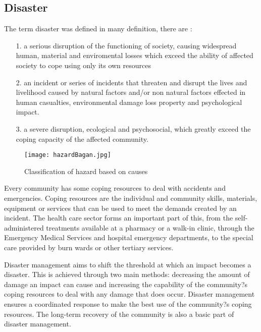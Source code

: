 \subsection{Disaster}
The term disaster was defined in many definition, there are :
\begin{enumerate}
\item[1.] a serious disruption of the functioning of society, causing widespread human, material and enviromental losses which exceed the ability of affected society to cope using only its own resources\cite{EffisientDM}
\item[2.] an incident or series of incidents that threaten and disrupt the lives and livelihood caused by natural factors and/or non natural factors effected in human casualties, environmental damage loss property and psychological impact\cite{DefinisiBencanaBNPB}.
\item[3.] a severe disruption, ecological and psychosocial, which greatly exceed the coping capacity of the affected community\cite{DisasterDefinition}.
\end{enumerate} \par
\begin{figure}[H]
    \begin{center}
    \texttt{[image: hazardBagan.jpg]}
        \caption{Classification of hazard based on causes\cite{definisiHazard}}
        \label{fig:DefinisiHazard}
    \end{center}
\end{figure}
Every community has some coping resources to deal with accidents and emergencies. Coping resources are the individual and community skills, materials, equipment or services that can be used to meet the demands created by an incident. The health care sector forms an important part of this, from the self-administered treatments available at a pharmacy or a walk-in clinic, through the Emergency Medical Services and hospital emergency departments, to the special care provided by burn wards or other tertiary services\cite{DMModelGuideline}.\par
Disaster management aims to shift the threshold at which an impact becomes a disaster\cite{DMModelGuideline}. This is achieved through two main methods: decreasing the amount of damage an impact can cause and increasing the capability of the community?s coping resources to deal with any damage that does occur. Disaster management ensures a coordinated response to make the best use of the community?s coping resources. The long-term recovery of the community is also a basic part of disaster management.\par

